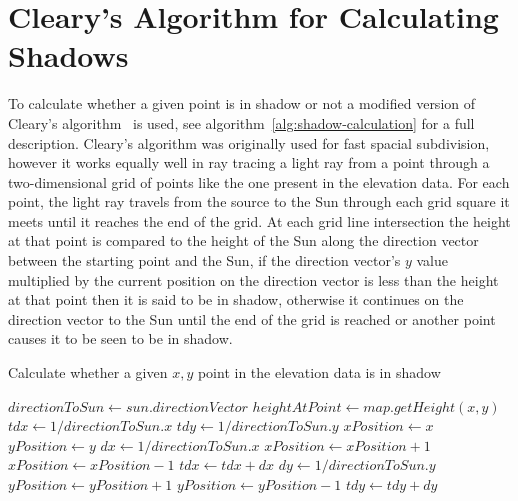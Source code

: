 \documentclass[12pt]{report}
\begin{document}
\section{Cleary's Algorithm for Calculating Shadows}
To calculate whether a given point is in shadow or not a modified version of Cleary's algorithm~\cite{cleary} is used, see algorithm~\ref{alg:shadow-calculation} for a full description. Cleary's algorithm was originally used for fast spacial subdivision, however it works equally well in ray tracing a light ray from a point through a two-dimensional grid of points like the one present in the elevation data. For each point, the light ray travels from the source to the Sun through each grid square it meets until it reaches the end of the grid. At each grid line intersection the height at that point is compared to the height of the Sun along the direction vector between the starting point and the Sun, if the direction vector's $y$ value multiplied by the current position on the direction vector is less than the height at that point then it is said to be in shadow, otherwise it continues on the direction vector to the Sun until the end of the grid is reached or another point causes it to be seen to be in shadow.

\begin{algorithm}[h]
\caption{Calculate whether a given $x,y$ point in the elevation data is in shadow}
\label{alg:shadow-calculation}%
\begin{algorithmic}           %
\STATE $\mathit{directionToSun} \leftarrow \mathit{sun}.\mathit{directionVector}$
\STATE $\mathit{heightAtPoint} \leftarrow \mathit{map}.\mathit{getHeight}(x,y)$
\STATE $\mathit{tdx} \leftarrow 1 / \mathit{directionToSun}.x$
\STATE $\mathit{tdy} \leftarrow 1 / \mathit{directionToSun}.y$
\STATE $\mathit{xPosition} \leftarrow x$
\STATE $\mathit{yPosition} \leftarrow y$
	\ENDIF
		\STATE $dx \leftarrow 1 / \mathit{directionToSun}.x$
			\STATE $\mathit{xPosition} \leftarrow \mathit{xPosition} + 1$	
		\ELSE
			\STATE $\mathit{xPosition} \leftarrow \mathit{xPosition} - 1$	
		\ENDIF
		\STATE $tdx \leftarrow tdx + dx$
	\ELSE
		\STATE $dy \leftarrow 1 / \mathit{directionToSun}.y$
			\STATE $\mathit{yPosition} \leftarrow \mathit{yPosition} + 1$	
		\ELSE
			\STATE $\mathit{yPosition} \leftarrow \mathit{yPosition} - 1$	
		\ENDIF
		\STATE $tdy \leftarrow tdy + dy$		
	\ENDIF
\ENDWHILE
{}
\end{algorithmic}
\end{algorithm}
\end{document}
